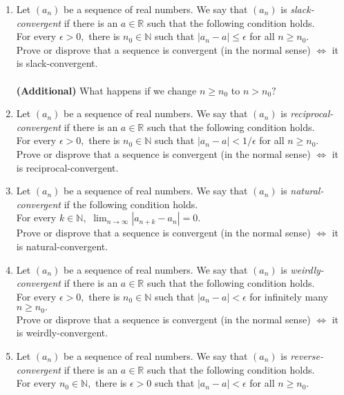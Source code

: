 \documentclass{article}
\begin{document}
\begin{enumerate}
	\item Let $(a_n)$ be a sequence of real numbers. We say that $(a_n)$ is \emph{slack-convergent} if there is an $a \in \mathbb{R}$ such that the following condition holds.\\
	For every $\epsilon > 0,$ there is $n_0 \in \mathbb{N}$ such that $|a_n - a| \le \epsilon$ for all $n \ge n_0.$\\
	Prove or disprove that a sequence is convergent (in the normal sense) $\iff$ it is slack-convergent.\\~\\
	\textbf{(Additional)} What happens if we change $n \ge n_0$ to $n > n_0?$
	\item Let $(a_n)$ be a sequence of real numbers. We say that $(a_n)$ is \emph{reciprocal-convergent} if there is an $a \in \mathbb{R}$ such that the following condition holds.\\
	For every $\epsilon > 0,$ there is $n_0 \in \mathbb{N}$ such that $|a_n - a| < 1/\epsilon$ for all $n \ge n_0.$\\
	Prove or disprove that a sequence is convergent (in the normal sense) $\iff$ it is reciprocal-convergent.
	\item Let $(a_n)$ be a sequence of real numbers. We say that $(a_n)$ is \emph{natural-convergent} if the following condition holds.\\
	For every $k \in \mathbb{N},$ $\displaystyle\lim_{n\to \infty}|a_{n+k} - a_n| = 0.$\\
	Prove or disprove that a sequence is convergent (in the normal sense) $\iff$ it is natural-convergent.
	\item Let $(a_n)$ be a sequence of real numbers. We say that $(a_n)$ is \emph{weirdly-convergent} if there is an $a \in \mathbb{R}$ such that the following condition holds.\\
	For every $\epsilon > 0,$ there is $n_0 \in \mathbb{N}$ such that $|a_n - a| < \epsilon$ for infinitely many $n \ge n_0.$\\
	Prove or disprove that a sequence is convergent (in the normal sense) $\iff$ it is weirdly-convergent.
	\item Let $(a_n)$ be a sequence of real numbers. We say that $(a_n)$ is \emph{reverse-convergent} if there is an $a \in \mathbb{R}$ such that the following condition holds.\\
	For every $n_0 \in \mathbb{N},$ there is $\epsilon > 0$ such that $|a_n - a| < \epsilon$ for all $n \ge n_0.$\\

\end{enumerate}
\end{document}
